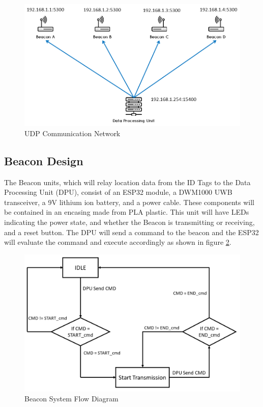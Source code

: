 \medskip
\begin{figure}[H]
\centering
    \includegraphics[scale=0.55]{./images/UDP.png}
    \caption{UDP Communication Network}
    \label{udp}
\end{figure}
\medskip



\pagebreak
\subsection{Beacon Design}
The Beacon units, which will relay location data from the ID Tags to the Data Processing Unit (DPU), consist of an ESP32 module, a DWM1000 UWB transceiver, a 9V lithium ion battery, and a power cable. These components will be contained in an encasing made from PLA plastic. This unit will have LEDs indicating the power state, and whether the Beacon is transmitting or receiving, and a reset button. The DPU will send a command to the beacon and the ESP32 will evaluate the command and execute accordingly as shown in figure \ref{bcn_flow}.

\medskip
\begin{figure}[H]
\centering
    \includegraphics[scale=0.40]{./images/beacon_flow.png}
    \caption{Beacon System Flow Diagram}
    \label{bcn_flow}
\end{figure}
\medskip

